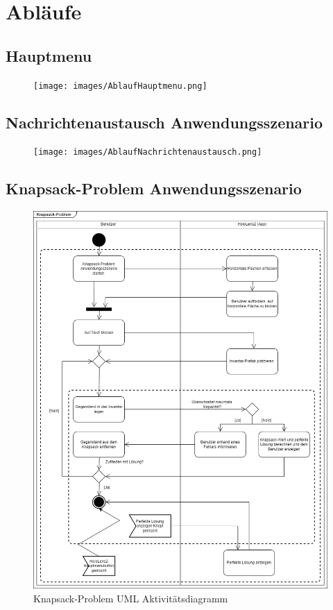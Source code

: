 \chapter{Abläufe}

\section{Hauptmenu}
\begin{figure}[htbp]
	\centering
	\texttt{[image: images/AblaufHauptmenu.png]}
\end{figure}
\newpage

\section{Nachrichtenaustausch Anwendungsszenario}
\begin{figure}[htbp]
	\centering
	\texttt{[image: images/AblaufNachrichtenaustausch.png]}
\end{figure}
\newpage

\section{Knapsack-Problem Anwendungsszenario}
\begin{figure}[htbp]
	\centering
	\includegraphics[width=\textwidth]{images/Knapsack_Ablauf.png}
	\caption{Knapsack-Problem UML Aktivitätsdiagramm}
\end{figure}
\newpage